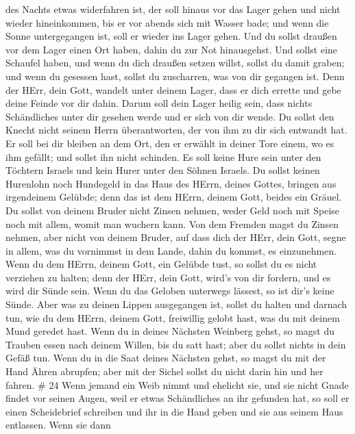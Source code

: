 des Nachts etwas widerfahren ist, der soll hinaus vor das Lager gehen
und nicht wieder hineinkommen,  bis er vor abends sich mit
Wasser bade; und wenn die Sonne untergegangen ist, soll er wieder ins
Lager gehen.  Und du sollst draußen vor dem Lager einen Ort
haben, dahin du zur Not hinausgehst.  Und sollst eine
Schaufel haben, und wenn du dich draußen setzen willst, sollst du damit
graben; und wenn du gesessen hast, sollst du zuscharren, was von dir
gegangen ist.  Denn der HErr, dein Gott, wandelt unter
deinem Lager, dass er dich errette und gebe deine Feinde vor dir dahin.
Darum soll dein Lager heilig sein, dass nichts Schändliches unter dir
gesehen werde und er sich von dir wende.  Du sollst den
Knecht nicht seinem Herrn überantworten, der von ihm zu dir sich
entwandt hat.  Er soll bei dir bleiben an dem Ort, den er
erwählt in deiner Tore einem, wo es ihm gefällt; und sollst ihn nicht
schinden.  Es soll keine Hure sein unter den Töchtern
Israels und kein Hurer unter den Söhnen Israels.  Du sollst
keinen Hurenlohn noch Hundegeld in das Haus des HErrn, deines Gottes,
bringen aus irgendeinem Gelübde; denn das ist dem HErrn, deinem Gott,
beides ein Gräuel.  Du sollst von deinem Bruder nicht
Zinsen nehmen, weder Geld noch mit Speise noch mit allem, womit man
wuchern kann.  Von dem Fremden magst du Zinsen nehmen, aber
nicht von deinem Bruder, auf dass dich der HErr, dein Gott, segne in
allem, was du vornimmst in dem Lande, dahin du kommst, es einzunehmen.
 Wenn du dem HErrn, deinem Gott, ein Gelübde tust, so
sollst du es nicht verziehen zu halten; denn der HErr, dein Gott, wird's
von dir fordern, und es wird dir Sünde sein.  Wenn du das
Geloben unterwegs lässest, so ist dir's keine Sünde.  Aber
was zu deinen Lippen ausgegangen ist, sollst du halten und darnach tun,
wie du dem HErrn, deinem Gott, freiwillig gelobt hast, was du mit deinem
Mund geredet hast.  Wenn du in deines Nächsten Weinberg
gehst, so magst du Trauben essen nach deinem Willen, bis du satt hast;
aber du sollst nichts in dein Gefäß tun.  Wenn du in die
Saat deines Nächsten gehst, so magst du mit der Hand Ähren abrupfen;
aber mit der Sichel sollst du nicht darin hin und her fahren. \# 24
 Wenn jemand ein Weib nimmt und ehelicht sie, und sie nicht
Gnade findet vor seinen Augen, weil er etwas Schändliches an ihr
gefunden hat, so soll er einen Scheidebrief schreiben und ihr in die
Hand geben und sie aus seinem Haus entlassen.  Wenn sie dann
